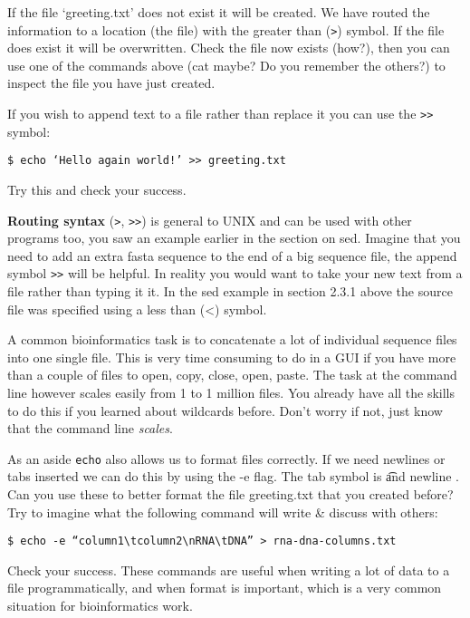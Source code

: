 \documentclass[11pt]{article}
\begin{document}
    If the file `greeting.txt' does not exist it will be created. We have
routed the information to a location (the file) with the greater than
(\texttt{\textgreater{}}) symbol. If the file does exist it will be
overwritten. Check the file now exists (how?), then you can use one of
the commands above (cat maybe? Do you remember the others?) to inspect
the file you have just created.

If you wish to append text to a file rather than replace it you can use
the \texttt{\textgreater{}\textgreater{}} symbol:

\begin{verbatim}
$ echo ‘Hello again world!’ >> greeting.txt
\end{verbatim}

Try this and check your success.

    \textbf{Routing syntax} (\texttt{\textgreater{}},
\texttt{\textgreater{}\textgreater{}}) is general to UNIX and can be
used with other programs too, you saw an example earlier in the section
on sed. Imagine that you need to add an extra fasta sequence to the end
of a big sequence file, the append symbol
\texttt{\textgreater{}\textgreater{}} will be helpful. In reality you
would want to take your new text from a file rather than typing it it.
In the sed example in section 2.3.1 above the source file was specified
using a less than (\textless{}) symbol.

A common bioinformatics task is to concatenate a lot of individual
sequence files into one single file. This is very time consuming to do
in a GUI if you have more than a couple of files to open, copy, close,
open, paste. The task at the command line however scales easily from 1
to 1 million files. You already have all the skills to do this if you
learned about wildcards before. Don't worry if not, just know that the
command line \emph{scales}.

As an aside \texttt{echo} also allows us to format files correctly. If
we need newlines or tabs inserted we can do this by using the -e flag.
The tab symbol is \t and newline \n. Can you use these to better format
the file greeting.txt that you created before? Try to imagine what the
following command will write \& discuss with others:

\begin{verbatim}
$ echo -e “column1\tcolumn2\nRNA\tDNA” > rna-dna-columns.txt
\end{verbatim}

Check your success. These commands are useful when writing a lot of data
to a file programmatically, and when format is important, which is a
very common situation for bioinformatics work.
\end{document}
